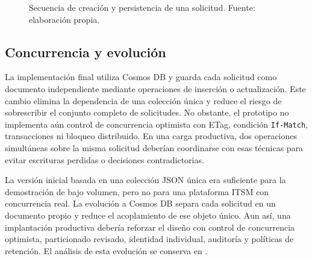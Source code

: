 \begin{figure}[H]
\centering
{}
\caption{Secuencia de creación y persistencia de una solicitud. Fuente: elaboración propia.}
\label{fig:secuencia-persistencia}
\end{figure}

\subsection{Concurrencia y evolución}

La implementación final utiliza Cosmos DB y guarda cada solicitud como documento independiente mediante operaciones de inserción o actualización. Este cambio elimina la dependencia de una colección única y reduce el riesgo de sobrescribir el conjunto completo de solicitudes. No obstante, el prototipo no implementa aún control de concurrencia optimista con ETag, condición \texttt{If-Match}, transacciones ni bloqueo distribuido. En una carga productiva, dos operaciones simultáneas sobre la misma solicitud deberían coordinarse con esas técnicas para evitar escrituras perdidas o decisiones contradictorias.

La versión inicial basada en una colección JSON única era suficiente para la demostración de bajo volumen, pero no para una plataforma ITSM con concurrencia real. La evolución a Cosmos DB separa cada solicitud en un documento propio y reduce el acoplamiento de ese objeto único. Aun así, una implantación productiva debería reforzar el diseño con control de concurrencia optimista, particionado revisado, identidad individual, auditoría y políticas de retención. El análisis de esta evolución se conserva en .


